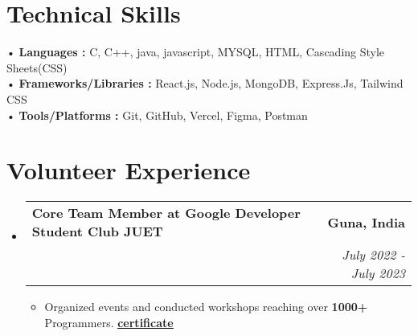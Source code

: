\documentclass[letterpaper,11pt]{article}
\makeatletter
\newcommand{\resumeItem}[1]{
  \item\small{
	{#1 \vspace{-2pt}}
  }
}
\newcommand{\resumeSubheading}[4]{
  \vspace{-2pt}\item
	\begin{tabular*}{1.0\textwidth}[t]{l@{\extracolsep{\fill}}r}
  	\textbf{#1} & \textbf{\small #2} \\
  	\textit{\small#3} & \textit{\small #4} \\
	\end{tabular*}\vspace{-7pt}
}
\newcommand{\resumeSubHeadingListStart}{\begin{itemize}[leftmargin=0.0in, label={}]}
\newcommand{\resumeSubHeadingListEnd}{\end{itemize}}
\newcommand{\resumeItemListStart}{\begin{itemize}}
\newcommand{\resumeItemListEnd}{\end{itemize}\vspace{-5pt}}
\makeatother
\begin{document}
\section{Technical Skills }
 \begin{itemize}[leftmargin=0.12in, label={}]
	\small{\item{
 	\hspace{-5pt}• \textbf{Languages : }{ C, C++, java, javascript, MYSQL, HTML, Cascading Style Sheets(CSS) } \\  \vspace{4pt}
        \hspace{-5pt}• \textbf{Frameworks/Libraries :}  {React.js, Node.js, MongoDB, Express.Js, Tailwind CSS } \\  \vspace{4pt}
        \hspace{-5pt}• \textbf{Tools/Platforms :}  {Git, GitHub, Vercel, Figma, Postman} \\
	}}
 \end{itemize}
 \vspace{-11pt}

 
\section{Volunteer Experience}
\begin{itemize}[leftmargin=0.12in, label={}]
\vspace{-8pt}
  \resumeSubHeadingListStart
	\resumeSubheading 
  	{Core Team Member at Google Developer Student Club JUET}{Guna, India}
    {}{July 2022 - July 2023}
  	\resumeItemListStart
      \vspace{-9pt}
    	\resumeItem{Organized events and conducted workshops reaching over \textbf{1000+} Programmers. {\href{https://drive.google.com/file/d/16ciNXQLWNNuhST4ud0wVfPa3oEdIm71R/view?usp=sharing}{\underline{\textbf{certificate}}} }} 
	\resumeItemListEnd
    
  \resumeSubHeadingListEnd
\end{itemize}
\vspace{-11pt}




 


 
\end{document}
